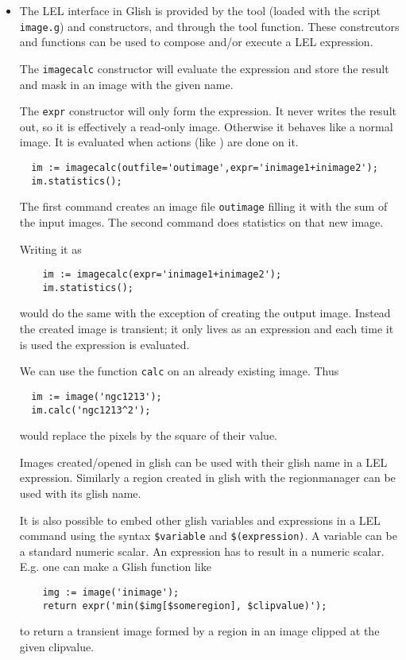 \begin{itemize}
\item

The LEL interface in Glish is provided by the
 tool (loaded with the script
\texttt{image.g})  and
 constructors, and through
the  tool function. 
These constrcutors and functions can be used
to compose and/or execute a LEL expression.

\medskip\noindent The \texttt{imagecalc} constructor will evaluate the expression and store
the result and mask in an image with the given name.

\medskip\noindent The \texttt{expr} constructor will only form the expression.  It never
writes the result out, so it is effectively a read-only image. 
Otherwise it behaves like a normal image.  It is evaluated when actions
(like ) are done on it. 

\begin{verbatim}
  im := imagecalc(outfile='outimage',expr='inimage1+inimage2');
  im.statistics();
\end{verbatim}

\medskip\noindent The first command creates an image file \texttt{outimage} filling
it with the sum of the input images. The second command does
statistics on that new image.

\medskip\noindent Writing it as
\begin{verbatim}
    im := imagecalc(expr='inimage1+inimage2');
    im.statistics();
\end{verbatim}
would do the same with the exception of creating the output image.
Instead the created image is transient; it only lives as an
expression and each time it is used the expression is evaluated.

\medskip\noindent We can use the function {\tt calc} on an already existing image.  Thus
\begin{verbatim}
  im := image('ngc1213');
  im.calc('ngc1213^2');
\end{verbatim}
would replace the pixels by the square of their value.

\medskip\noindent Images created/opened in glish can be used with their glish name
in a LEL expression. Similarly a region created in glish with the
regionmanager can be used with its glish name.

\medskip\noindent It is also possible to embed other glish variables and expressions in
a LEL command using the syntax \texttt{\$variable} and
\texttt{\$(expression)}. A variable can be a standard numeric scalar.
An expression has to result in a numeric scalar.
E.g. one can make a Glish function like
\begin{verbatim}
    img := image('inimage');
    return expr('min($img[$someregion], $clipvalue)');
\end{verbatim}
to return a transient image formed by a region in an image clipped at the
given clipvalue.


\end{itemize}
